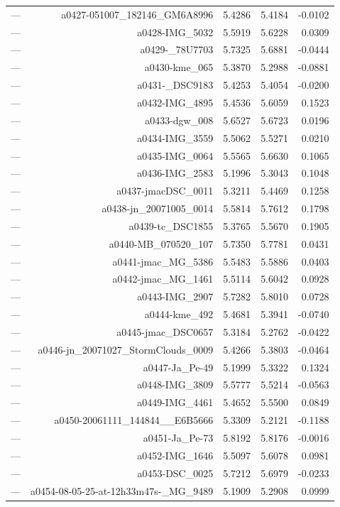 \begin{table}[htbp]
\begin{tabular}{lrrrr}
— & a0427-051007_182146_GM6A8996 & 5.4286 & 5.4184 & -0.0102 \\
— & a0428-IMG_5032 & 5.5919 & 5.6228 & 0.0309 \\
— & a0429-_78U7703 & 5.7325 & 5.6881 & -0.0444 \\
— & a0430-kme_065 & 5.3870 & 5.2988 & -0.0881 \\
— & a0431-_DSC9183 & 5.4253 & 5.4054 & -0.0200 \\
— & a0432-IMG_4895 & 5.4536 & 5.6059 & 0.1523 \\
— & a0433-dgw_008 & 5.6527 & 5.6723 & 0.0196 \\
— & a0434-IMG_3559 & 5.5062 & 5.5271 & 0.0210 \\
— & a0435-IMG_0064 & 5.5565 & 5.6630 & 0.1065 \\
— & a0436-IMG_2583 & 5.1996 & 5.3043 & 0.1048 \\
— & a0437-jmacDSC_0011 & 5.3211 & 5.4469 & 0.1258 \\
— & a0438-jn_20071005_0014 & 5.5814 & 5.7612 & 0.1798 \\
— & a0439-tc_DSC1855 & 5.3765 & 5.5670 & 0.1905 \\
— & a0440-MB_070520_107 & 5.7350 & 5.7781 & 0.0431 \\
— & a0441-jmac_MG_5386 & 5.5483 & 5.5886 & 0.0403 \\
— & a0442-jmac_MG_1461 & 5.5114 & 5.6042 & 0.0928 \\
— & a0443-IMG_2907 & 5.7282 & 5.8010 & 0.0728 \\
— & a0444-kme_492 & 5.4681 & 5.3941 & -0.0740 \\
— & a0445-jmac_DSC0657 & 5.3184 & 5.2762 & -0.0422 \\
— & a0446-jn_20071027_StormClouds_0009 & 5.4266 & 5.3803 & -0.0464 \\
— & a0447-Ja_Pe-49 & 5.1999 & 5.3322 & 0.1324 \\
— & a0448-IMG_3809 & 5.5777 & 5.5214 & -0.0563 \\
— & a0449-IMG_4461 & 5.4652 & 5.5500 & 0.0849 \\
— & a0450-20061111_144844__E6B5666 & 5.3309 & 5.2121 & -0.1188 \\
— & a0451-Ja_Pe-73 & 5.8192 & 5.8176 & -0.0016 \\
— & a0452-IMG_1646 & 5.5097 & 5.6078 & 0.0981 \\
— & a0453-DSC_0025 & 5.7212 & 5.6979 & -0.0233 \\
— & a0454-08-05-25-at-12h33m47s-_MG_9489 & 5.1909 & 5.2908 & 0.0999 \\

\end{tabular}
\end{table}
